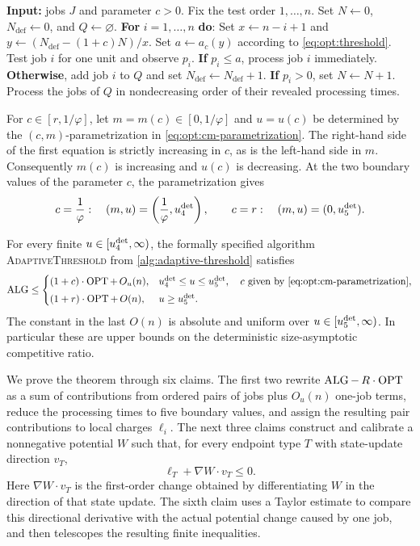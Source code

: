 \begin{algorithm}[H]
\caption{}
\label{alg:adaptive-threshold}
\begin{algorithmic}
\Statex \textbf{Input:} jobs $J$ and parameter $c>0$.
\State Fix the test order $1,\ldots,n$.
\State Set $N\gets0$, $N_{\mathrm{def}}\gets0$, and $Q\gets\varnothing$.
\State \textbf{For} $i=1,\ldots,n$ \textbf{do}:
\State \quad Set $x\gets n-i+1$ and $y\gets(N_{\mathrm{def}}-(1+c)N)/x$.
\State \quad Set $a\gets a_c(y)$ according to \cref{eq:opt:threshold}.
\State \quad Test job $i$ for one unit and observe $p_i$.
\State \quad \textbf{If} $p_i\le a$, process job $i$ immediately.
\State \quad \textbf{Otherwise}, add job $i$ to $Q$ and set $N_{\mathrm{def}}\gets N_{\mathrm{def}}+1$.
\State \quad \textbf{If} $p_i>0$, set $N\gets N+1$.
\State Process the jobs of $Q$ in nondecreasing order of their revealed
       processing times.
\end{algorithmic}
\end{algorithm}

For $c\in[r,1/\varphi]$, let $m=m(c)\in[0,1/\varphi]$ and $u=u(c)$ be
determined by the $(c,m)$-parametrization in
\cref{eq:opt:cm-parametrization}.
The right-hand side of the first equation is strictly increasing in $c$,
as is the left-hand side in $m$.  Consequently $m(c)$ is increasing and
$u(c)$ is decreasing.  At the two boundary values of the parameter $c$, the
parametrization gives
\[
 c=\frac1\varphi:\quad
 (m,u)=\left(\frac1\varphi,u_{4}^{\mathrm{det}}\right),
 \qquad
 c=r:\quad (m,u)=(0,u_{5}^{\mathrm{det}}).
\]

\begin{theorem}
\label{thm:opt:optional-middle-upper}
For every finite $u\in[u_{4}^{\mathrm{det}},\infty)$, the formally specified algorithm
\textnormal{\textsc{AdaptiveThreshold}} from
\cref{alg:adaptive-threshold}
satisfies
\[
 \operatorname{ALG}\le
 \begin{cases}
  (1+c)\cdot\operatorname{OPT}+\,O_u(n),
     & u_{4}^{\mathrm{det}}\le u\le u_{5}^{\mathrm{det}},
       \quad c\text{ given by \eqref{eq:opt:cm-parametrization}},\\[1mm]
  (1+r)\cdot\operatorname{OPT}+\,O(n),
     & u\ge u_{5}^{\mathrm{det}}.
 \end{cases}
\]
The constant in the last $O(n)$ is absolute and uniform over
$u\in[u_{5}^{\mathrm{det}},\infty)$.
In particular these are upper bounds on the deterministic
size-asymptotic competitive ratio.
\end{theorem}

We prove the theorem through six claims.  The first two rewrite
$\operatorname{ALG}-\,R\cdot\operatorname{OPT}$ as a sum of contributions from ordered pairs of jobs plus
$O_u(n)$ one-job terms, reduce the processing times to five boundary values,
and assign the resulting pair contributions to local charges $\ell_i$.
The next three claims construct and calibrate a nonnegative potential $W$
such that, for every endpoint type $T$ with state-update direction $v_T$,
\[
 \ell_T+\nabla W\mathbin{\cdot}v_T\le0.
\]
Here $\nabla W\mathbin{\cdot}v_T$ is the first-order change obtained by
differentiating $W$ in the direction of that state update.
The sixth claim uses a Taylor estimate to compare this directional derivative
with the actual potential change caused by one job, and then telescopes the
resulting finite inequalities.

